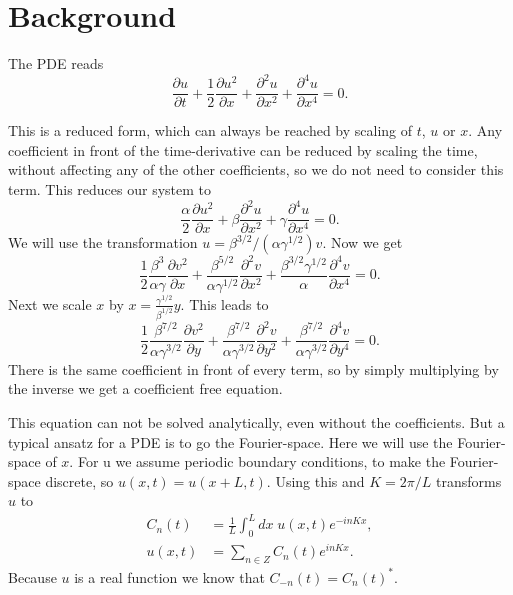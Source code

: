 \section{Background}
The PDE reads
\begin{equation}
  \frac{\partial u }{\partial t} + \frac{1}{2} \frac{\partial u^2 }{\partial x} + \frac{\partial^2 u }{\partial x^2} + \frac{\partial^4 u }{\partial x^4} = 0.\label{eq:PDE}
\end{equation}

This is a reduced form, which can always be reached by scaling of $t$, $u$ or $x$.
Any coefficient in front of the time-derivative can be reduced by scaling the time, without affecting any of the other coefficients, so we do not need to consider this term.
This reduces our system to
\begin{equation}
  \frac{\alpha}{2} \frac{\partial u^2 }{\partial x} + \beta \frac{\partial^2 u }{\partial x^2} + \gamma \frac{\partial^4 u }{\partial x^4} = 0.
\end{equation}
We will use the transformation $ u =\beta^{3/2}/(\alpha \gamma^{1/2}) v $.
Now we get
\begin{equation}
  \frac{1}{2} \frac{\beta^3}{\alpha \gamma} \frac{\partial v^2 }{\partial x} + \frac{\beta^{5/2}}{\alpha \gamma^{1/2}} \frac{\partial^2 v }{\partial x^2} + \frac{\beta^{3/2} \gamma^{1/2}}{\alpha} \frac{\partial^4 v }{\partial x^4} = 0.
\end{equation}
Next we scale $x$ by $ x = \frac{\gamma^{1/2}}{\beta^{1/2}} y $.
This leads to
\begin{equation}
  \frac{1}{2} \frac{\beta^{7/2}}{\alpha \gamma^{3/2}} \frac{\partial v^2 }{\partial y} + \frac{\beta^{7/2}}{\alpha \gamma^{3/2}} \frac{\partial^2 v }{\partial y^2} + \frac{\beta^{7/2}}{\alpha \gamma^{3/2}} \frac{\partial^4 v }{\partial y^4} = 0.
\end{equation}
There is the same coefficient in front of every term, so by simply multiplying by the inverse we get a coefficient free equation.

This equation can not be solved analytically, even without the coefficients.
But a typical ansatz for a PDE is to go the Fourier-space.
Here we will use the Fourier-space of $x$.
For u we assume periodic boundary conditions, to make the Fourier-space discrete, so $ u(x, t) = u(x + L, t) $.
Using this and $ K = 2 \pi/L $ transforms $u$ to
\begin{align}
  C_n(t) & = \frac{1}{L} \int_0^L dx \; u(x,t) e^{-in K x}, \\
  u(x, t) & = \sum_{n \in Z} C_n (t) e^{in K x}. \label{eq:inverse}
\end{align}
Because $u$ is a real function we know that $C_{-n}(t) = {C_n(t)}^{*}$.

